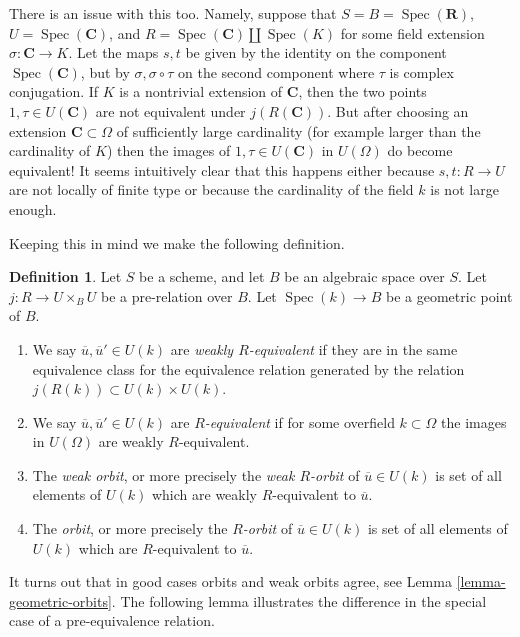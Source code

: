 \documentclass{stacks-project}
\theoremstyle{plain}
\theoremstyle{definition}
\newtheorem{definition}[subsection]{Definition}
\theoremstyle{remark}
\numberwithin{equation}{subsection}
\def\Spec{\mathop{\mathrm{Spec}}}
\begin{document}
\medskip\noindent
There is an issue with this too. Namely, suppose that
$S = B = \Spec(\mathbf{R})$,
$U = \Spec(\mathbf{C})$, and
$R = \Spec(\mathbf{C}) \amalg \Spec(K)$
for some field extension $\sigma : \mathbf{C} \to K$.
Let the maps $s, t$ be given by the identity on the component
$\Spec(\mathbf{C})$, but by $\sigma, \sigma \circ \tau$ on the
second component where $\tau$ is complex conjugation. If
$K$ is a nontrivial extension of $\mathbf{C}$, then the two points
$1, \tau \in U(\mathbf{C})$ are not equivalent under
$j(R(\mathbf{C}))$. But after choosing an extension $\mathbf{C} \subset \Omega$
of sufficiently large cardinality (for example larger than the cardinality
of $K$) then the images of $1, \tau \in U(\mathbf{C})$ in
$U(\Omega)$ do become equivalent! It seems intuitively clear that
this happens either because $s, t : R \to U$ are not locally of finite type
or because the cardinality of the field $k$ is not large enough.

\medskip\noindent
Keeping this in mind we make the following definition.

\begin{definition}
\label{definition-geometric-orbits}
Let $S$ be a scheme, and let $B$ be an algebraic space over $S$.
Let $j : R \to U \times_B U$ be a pre-relation over $B$.
Let $\Spec(k) \to B$ be a geometric point of $B$.
\begin{enumerate}
\item We say $\overline{u}, \overline{u}' \in U(k)$ are
{\it weakly $R$-equivalent} if they are in the same equivalence class
for the equivalence relation generated by the relation
$j(R(k)) \subset U(k) \times U(k)$.
\item We say $\overline{u}, \overline{u}' \in U(k)$ are
{\it $R$-equivalent} if for some overfield $k \subset \Omega$
the images in $U(\Omega)$ are weakly $R$-equivalent.
\item The {\it weak orbit}, or more precisely the {\it weak $R$-orbit}
of $\overline{u} \in U(k)$ is set of all
elements of $U(k)$ which are weakly $R$-equivalent to $\overline{u}$.
\item The {\it orbit}, or more precisely the {\it $R$-orbit}
of $\overline{u} \in U(k)$ is set of all
elements of $U(k)$ which are $R$-equivalent to $\overline{u}$.
\end{enumerate}
\end{definition}

\noindent
It turns out that in good cases orbits and weak orbits agree, see
Lemma \ref{lemma-geometric-orbits}. The following lemma illustrates
the difference in the special case of a pre-equivalence relation.
\end{document}
